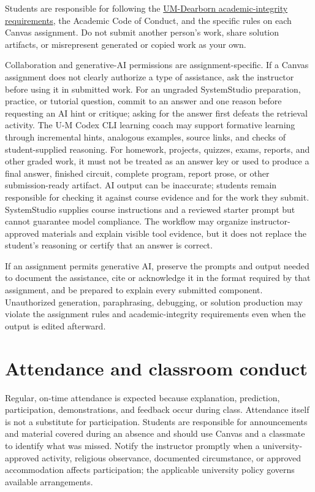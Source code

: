 \documentclass[10pt,letterpaper]{article}
\begin{document}
Students are responsible for following the \href{https://umdearborn.edu/policies-and-procedures/faculty-and-staff-policies-and-procedures/academic-integrity}{UM-Dearborn academic-integrity requirements}, the Academic Code of Conduct, and the specific rules on each Canvas assignment. Do not submit another person's work, share solution artifacts, or misrepresent generated or copied work as your own.

Collaboration and generative-AI permissions are assignment-specific. If a Canvas assignment does not clearly authorize a type of assistance, ask the instructor before using it in submitted work. For an ungraded SystemStudio preparation, practice, or tutorial question, commit to an answer and one reason before requesting an AI hint or critique; asking for the answer first defeats the retrieval activity. The U-M Codex CLI learning coach may support formative learning through incremental hints, analogous examples, source links, and checks of student-supplied reasoning. For homework, projects, quizzes, exams, reports, and other graded work, it must not be treated as an answer key or used to produce a final answer, finished circuit, complete program, report prose, or other submission-ready artifact. AI output can be inaccurate; students remain responsible for checking it against course evidence and for the work they submit. SystemStudio supplies course instructions and a reviewed starter prompt but cannot guarantee model compliance. The workflow may organize instructor-approved materials and explain visible tool evidence, but it does not replace the student's reasoning or certify that an answer is correct.

If an assignment permits generative AI, preserve the prompts and output needed to document the assistance, cite or acknowledge it in the format required by that assignment, and be prepared to explain every submitted component. Unauthorized generation, paraphrasing, debugging, or solution production may violate the assignment rules and academic-integrity requirements even when the output is edited afterward.

\section{Attendance and classroom conduct}

Regular, on-time attendance is expected because explanation, prediction, participation, demonstrations, and feedback occur during class. Attendance itself is not a substitute for participation. Students are responsible for announcements and material covered during an absence and should use Canvas and a classmate to identify what was missed. Notify the instructor promptly when a university-approved activity, religious observance, documented circumstance, or approved accommodation affects participation; the applicable university policy governs available arrangements.
\end{document}
